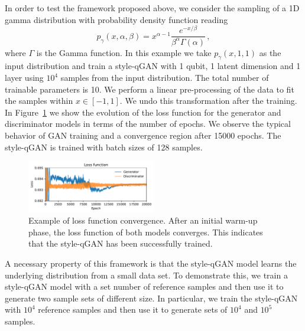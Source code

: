 \documentclass[twocolumn,preprintnumbers,superscriptaddress]{revtex4-2}
\begin{document}
In order to test the framework proposed above, we
consider the sampling of a 1D gamma distribution with probability density
function reading
\begin{equation}
  p_\gamma (x, \alpha, \beta) = x^{\alpha-1} \frac{e^{-x/\beta}}{\beta^\alpha \Gamma(\alpha)}\,,
\end{equation}
where $\Gamma$ is the Gamma function. In this example we take $p_\gamma (x, 1,
1)$ as the input distribution and train a style-qGAN with 1 qubit, 1 latent dimension and
1 layer using $10^4$ samples from the input distribution. The total number of trainable parameters is 10. We perform a linear pre-processing of the data to fit the samples within $x \in [-1, 1]$. We undo this transformation after the training.
%
In Figure~\ref{fig:loss} we show the evolution of the loss function for the
generator and discriminator models in terms of the number of epochs. We observe the
typical behavior of GAN training and a convergence region after 15000 epochs.
%
The style-qGAN is trained with batch sizes of 128 samples.

\begin{figure}
  \includegraphics[width=0.5\textwidth]{plots/1Dgamma/1Dgamma_loss.pdf}
  \caption{\label{fig:loss}Example of loss function convergence. After an initial warm-up phase, the loss function of both models converges. This indicates that the style-qGAN has been successfully trained.}
\end{figure}

A necessary property of this framework is that the style-qGAN model learns the underlying distribution from a small data set. To demonstrate this, we train a style-qGAN model with a set number of reference samples and then use it to generate two sample sets of different size. In particular, we train the style-qGAN with $10^4$ reference samples and then use it to generate sets of $10^4$ and $10^5$ samples.
\end{document}
